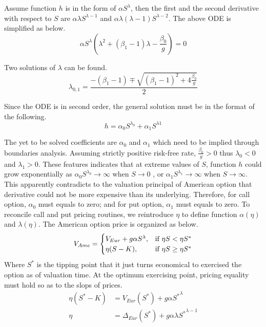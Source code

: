 \documentclass{article}
\begin{document}
Assume function $ h $ is in the form of $ \alpha S^{\lambda} $, then the first and the second derivative with respect to $ S $ are $ \alpha \lambda S^{\lambda - 1} $ and $ \alpha \lambda \left(\lambda - 1\right) S^{\lambda - 2} $.
The above ODE is simplified as below.
\begin{equation}
    \alpha S^{\lambda} \left(\lambda^2 + \left(\beta_{1} - 1\right) \lambda - \frac{\beta_{0}}{g} \right) = 0
\end{equation}
    
Two solutions of $ \lambda $ can be found.
\begin{equation}
    \lambda_{0, 1} = \frac{-\left(\beta_{1} - 1\right) \mp \sqrt{\left(\beta_{1} - 1\right)^2 + 4 \frac{\beta_{0}}{g}}}{2}
\end{equation}

Since the ODE is in second order, the general solution must be in the format of the following.
\begin{equation}
    h = \alpha_{0} S^{\lambda_{0}} + \alpha_{1} S^{\lambda{1}}
\end{equation}

The yet to be solved coefficients are $ \alpha_{0} $ and $ \alpha_{1} $ which need to be implied through boundaries analysis.
Assuming strictly positive risk-free rate, $ \frac{\beta_{0}}{g} > 0 $ thus $ \lambda_{0} < 0 $ and $ \lambda_{1} > 0$.
These features indicates that at extreme values of $ S $, function $ h $ could grow exponentially as $ \alpha_{0} S^{\lambda_{0}} \to \infty $ when $ S \to 0 $ , or $ \alpha_{1} S^{\lambda_{1}} \to \infty $ when $ S \to \infty $.
This apparently contradicts to the valuation principal of American option that derivative could not be more expensive than its underlying.
Therefore, for call option, $ \alpha_{0} $ must equals to zero; and for put option, $ \alpha_{1} $ must equals to zero.
To reconcile call and put pricing routines, we reintroduce $ \eta $ to define function $ \alpha(\eta) $ and $ \lambda(\eta) $.
The American option price is organized as below.
\begin{equation}
    V_{Ame} = 
    \begin{cases}
        V_{Eur} + g \alpha S^{\lambda}, & \mbox{if $ \eta S < \eta S^* $}\\
        \eta (S - K), & \mbox{if $ \eta S \geq \eta S^* $}
    \end{cases}
\end{equation}
Where $ S^* $ is the tipping point that it just turns economical to exercised the option as of valuation time.
At the optimum exercising point, pricing equality must hold so as to the slops of prices.
\begin{align}
    \eta (S^* - K) &= V_{Eur}(S^*) + g \alpha {S^*}^{\lambda} \\
    \eta &= \Delta_{Eur}(S^*) + g \alpha \lambda {S^*}^{\lambda - 1}
\end{align}
\end{document}
